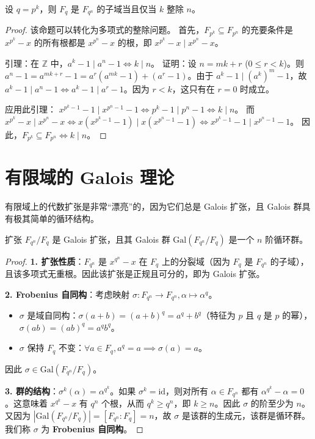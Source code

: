 \documentclass[11pt]{article}
\begin{document}
\begin{cntheorem}
    设 $q = p^k$，则 $F_q$ 是 $F_{q^n}$ 的子域当且仅当 $k$ 整除 $n$。
\end{cntheorem}
\begin{proof}
    该命题可以转化为多项式的整除问题。
    首先，$F_{p^k} \subseteq F_{p^n}$ 的充要条件是 $x^{p^k} - x$ 的所有根都是 $x^{p^n} - x$ 的根，即 $x^{p^k} - x \mid x^{p^n} - x$。
    
    引理：在 $\mathbb{Z}$ 中，$a^k - 1 \mid a^n - 1 \iff k \mid n$。
    证明：设 $n = mk + r$ ($0 \le r < k$)。则 $a^n - 1 = a^{mk+r} - 1 = a^r(a^{mk} - 1) + (a^r - 1)$。由于 $a^k - 1 \mid (a^k)^m - 1$，故 $a^k - 1 \mid a^n - 1 \iff a^k - 1 \mid a^r - 1$。因为 $r < k$，这只有在 $r=0$ 时成立。

    应用此引理：
    $x^{p^k-1} - 1 \mid x^{p^n-1} - 1 \iff p^k - 1 \mid p^n - 1 \iff k \mid n$。
    而 $x^{p^k} - x \mid x^{p^n} - x \iff x(x^{p^k-1} - 1) \mid x(x^{p^n-1} - 1) \iff x^{p^k-1} - 1 \mid x^{p^n-1} - 1$。
    因此，$F_{p^k} \subseteq F_{p^n} \iff k \mid n$。
\end{proof}

\section{有限域的 Galois 理论}

有限域上的代数扩张是非常“漂亮”的，因为它们总是 Galois 扩张，且 Galois 群具有极其简单的循环结构。

\begin{cntheorem}
    扩张 $F_{q^n} / F_q$ 是 Galois 扩张，且其 Galois 群 $\text{Gal}(F_{q^n}/F_q)$ 是一个 $n$ 阶循环群。
\end{cntheorem}
\begin{proof}
    \textbf{1. 扩张性质}：$F_{q^n}$ 是 $x^{q^n} - x$ 在 $F_q$ 上的分裂域（因为 $F_q$ 是 $F_{q^n}$ 的子域），且该多项式无重根。因此该扩张是正规且可分的，即为 Galois 扩张。

    \textbf{2. Frobenius 自同构}：考虑映射 $\sigma : F_{q^n} \to F_{q^n}, \alpha \mapsto \alpha^q$。
    \begin{itemize}
        \item $\sigma$ 是域自同构：$\sigma(a+b) = (a+b)^q = a^q + b^q$（特征为 $p$ 且 $q$ 是 $p$ 的幂），$\sigma(ab) = (ab)^q = a^q b^q$。
        \item $\sigma$ 保持 $F_q$ 不变：$\forall a \in F_q, a^q = a \implies \sigma(a) = a$。
    \end{itemize}
    因此 $\sigma \in \text{Gal}(F_{q^n}/F_q)$。

    \textbf{3. 群的结构}：$\sigma^k(\alpha) = \alpha^{q^k}$。如果 $\sigma^k = \text{id}$，则对所有 $\alpha \in F_{q^n}$ 都有 $\alpha^{q^k} - \alpha = 0$。这意味着 $x^{q^k} - x$ 有 $q^n$ 个根，从而 $q^k \ge q^n$，即 $k \ge n$。因此 $\sigma$ 的阶至少为 $n$。又因为 $|\text{Gal}(F_{q^n}/F_q)| = [F_{q^n} : F_q] = n$，故 $\sigma$ 是该群的生成元，该群是循环群。我们称 $\sigma$ 为 \textbf{Frobenius 自同构}。
\end{proof}
\end{document}
